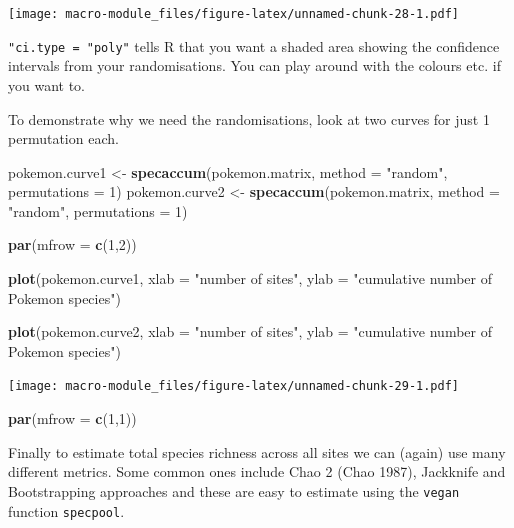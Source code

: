 \documentclass[]{book}
\newenvironment{Shaded}{\begin{snugshade}}{\end{snugshade}}
\newcommand{\KeywordTok}[1]{\textcolor[rgb]{0.13,0.29,0.53}{\textbf{{#1}}}}
\newcommand{\DataTypeTok}[1]{\textcolor[rgb]{0.13,0.29,0.53}{{#1}}}
\newcommand{\DecValTok}[1]{\textcolor[rgb]{0.00,0.00,0.81}{{#1}}}
\newcommand{\StringTok}[1]{\textcolor[rgb]{0.31,0.60,0.02}{{#1}}}
\newcommand{\NormalTok}[1]{{#1}}
\theoremstyle{definition}
\theoremstyle{definition}
\theoremstyle{definition}
\theoremstyle{remark}
\begin{document}
\texttt{[image: macro-module\_files/figure-latex/unnamed-chunk-28-1.pdf]}

\texttt{"ci.type\ =\ "poly"} tells R that you want a shaded area showing
the confidence intervals from your randomisations. You can play around
with the colours etc. if you want to.

To demonstrate why we need the randomisations, look at two curves for
just 1 permutation each.

\begin{Shaded}
\begin{Highlighting}[]
\NormalTok{pokemon.curve1 <-}\StringTok{ }\KeywordTok{specaccum}\NormalTok{(pokemon.matrix, }\DataTypeTok{method =} \StringTok{"random"}\NormalTok{, }\DataTypeTok{permutations =} \DecValTok{1}\NormalTok{)}
\NormalTok{pokemon.curve2 <-}\StringTok{ }\KeywordTok{specaccum}\NormalTok{(pokemon.matrix, }\DataTypeTok{method =} \StringTok{"random"}\NormalTok{, }\DataTypeTok{permutations =} \DecValTok{1}\NormalTok{)}

\KeywordTok{par}\NormalTok{(}\DataTypeTok{mfrow =} \KeywordTok{c}\NormalTok{(}\DecValTok{1}\NormalTok{,}\DecValTok{2}\NormalTok{))}

\KeywordTok{plot}\NormalTok{(pokemon.curve1,  }
    \DataTypeTok{xlab =} \StringTok{"number of sites"}\NormalTok{, }\DataTypeTok{ylab =} \StringTok{"cumulative number of Pokemon species"}\NormalTok{)}

\KeywordTok{plot}\NormalTok{(pokemon.curve2, }
    \DataTypeTok{xlab =} \StringTok{"number of sites"}\NormalTok{, }\DataTypeTok{ylab =} \StringTok{"cumulative number of Pokemon species"}\NormalTok{)}
\end{Highlighting}
\end{Shaded}

\texttt{[image: macro-module\_files/figure-latex/unnamed-chunk-29-1.pdf]}

\begin{Shaded}
\begin{Highlighting}[]
\KeywordTok{par}\NormalTok{(}\DataTypeTok{mfrow =} \KeywordTok{c}\NormalTok{(}\DecValTok{1}\NormalTok{,}\DecValTok{1}\NormalTok{))}
\end{Highlighting}
\end{Shaded}

Finally to estimate total species richness across all sites we can
(again) use many different metrics. Some common ones include Chao 2
(Chao 1987), Jackknife and Bootstrapping approaches and these are easy
to estimate using the \texttt{vegan} function \texttt{specpool}.
\end{document}
